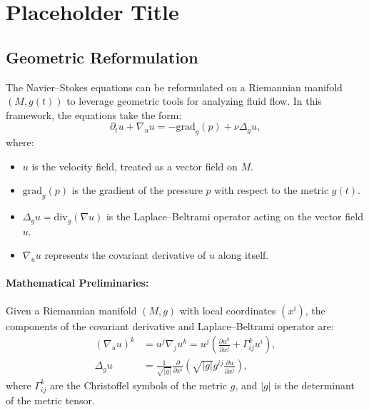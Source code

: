 \section{Placeholder Title}

\subsection{Geometric Reformulation}
The Navier--Stokes equations can be reformulated on a Riemannian manifold $(M, g(t))$ to leverage geometric tools for analyzing fluid flow. In this framework, the equations take the form:
\begin{equation}
\partial_t u + \nabla_u u = -\text{grad}_g(p) + \nu \Delta_g u, \label{eq:riemannian_navier_stokes}
\end{equation}
where:
\begin{itemize}
    \item $u$ is the velocity field, treated as a vector field on $M$.
    \item $\text{grad}_g(p)$ is the gradient of the pressure $p$ with respect to the metric $g(t)$.
    \item $\Delta_g u = \text{div}_g(\nabla u)$ is the Laplace--Beltrami operator acting on the vector field $u$.
    \item $\nabla_u u$ represents the covariant derivative of $u$ along itself.
\end{itemize}

\paragraph{Mathematical Preliminaries:}
Given a Riemannian manifold $(M, g)$ with local coordinates $(x^i)$, the components of the covariant derivative and Laplace--Beltrami operator are:
\begin{align}
(\nabla_u u)^k &= u^j \nabla_j u^k = u^j \left( \frac{\partial u^k}{\partial x^j} + \Gamma^k_{ij} u^i \right), \label{eq:covariant_derivative} \\
\Delta_g u &= \frac{1}{\sqrt{|g|}} \frac{\partial}{\partial x^i} \left( \sqrt{|g|} g^{ij} \frac{\partial u}{\partial x^j} \right), \label{eq:laplace_beltrami}
\end{align}
where $\Gamma^k_{ij}$ are the Christoffel symbols of the metric $g$, and $|g|$ is the determinant of the metric tensor.

